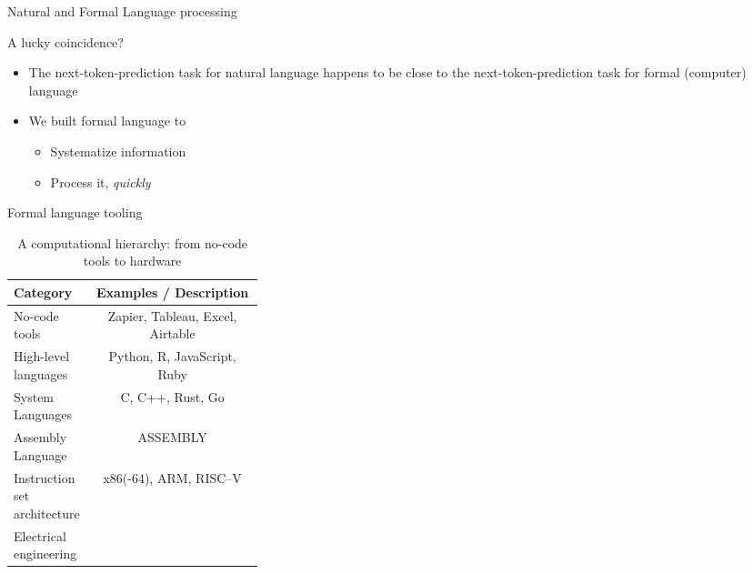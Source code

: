 \documentclass[aspectratio=1610, xcolor={dvipsnames}]{beamer}
\begin{document}
\begin{frame}{Natural and Formal Language processing}
    \begin{block}{A lucky coincidence?}
        \vspace{0.8em}
        \begin{itemize}
            \item The next-token-prediction task for natural language happens to be close to the next-token-prediction task for formal (computer) language
            \item We built formal language to
                  \begin{itemize}
                      \item Systematize information
                      \item Process it, \textit{quickly}
                  \end{itemize}
        \end{itemize}

    \end{block}

\end{frame}


\begin{frame}{Formal language tooling}

    \begin{table}[h]
        \centering
        \renewcommand{\arraystretch}{1.2}
        \begin{tabular}{p{0.32\linewidth}c}
            \hline
            \textbf{Category}            & \textbf{Examples / Description}  \\
            \hline
            No-code tools                & Zapier, Tableau, Excel, Airtable \\
            High-level languages         & Python, R, JavaScript, Ruby      \\
            System Languages             & C, C++, Rust, Go                 \\
            Assembly Language            & ASSEMBLY                         \\
            Instruction set architecture & x86(-64), ARM, RISC--V           \\
            Electrical engineering       &                                  \\
            \hline
        \end{tabular}
        \caption{A computational hierarchy: from no-code tools to hardware}
    \end{table}

\end{frame}
\end{document}

